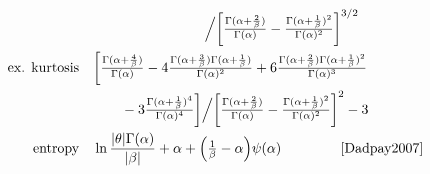 \begin{table*}[pt!]
\begin{align*}
 \hspace{-3em}
 \\ & \qquad \qquad \qquad \qquad \Big /
 \Left[  \tfrac{\Gamma(\alpha+\frac{2}{\beta})}{\Gamma(\alpha)}  - 
\tfrac{\Gamma(\alpha+\frac{1}{\beta})^2}{\Gamma(\alpha)^2}    \Right]^{3/2}
\hspace{-3em}
\checked
\\
\text{ex. kurtosis} \quad  &  
 \bigg[  \tfrac{\Gamma(\alpha+\frac{4}{\beta})}{\Gamma(\alpha)} 
 - 4 \tfrac{\Gamma(\alpha+\frac{3}{\beta})\Gamma(\alpha+\frac{1}{\beta})}{\Gamma(\alpha)^2}    
 + 6 \tfrac{\Gamma(\alpha+\frac{2}{\beta})\Gamma(\alpha+\frac{1}{\beta})^2}{\Gamma(\alpha)^3}    
\hspace{-3em}
\checked
 \\ & \qquad 
 -3  \tfrac{\Gamma(\alpha+\frac{1}{\beta})^4}{\Gamma(\alpha)^4}   \bigg]
 \Big /
 \Left[  \tfrac{\Gamma(\alpha+\frac{2}{\beta})}{\Gamma(\alpha)}  - 
\tfrac{\Gamma(\alpha+\frac{1}{\beta})^2}{\Gamma(\alpha)^2}    \Right]^{2}
-3 
\hspace{-3em}
\\
\text{entropy} \quad& 
\ln \frac{|\theta| \Gamma(\alpha)}{|\beta|} +\alpha + \Left( \sfrac{1}{\beta} - \alpha\Right) \psi(\alpha) \checked &
\text{\cite{Dadpay2007}}
\end{align*}
\end{table*}


